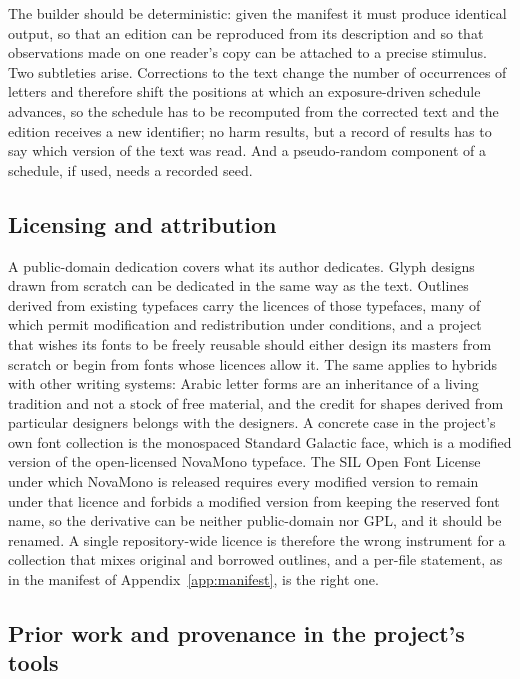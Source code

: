 The builder should be deterministic: given the manifest it must produce identical output, so that an edition can be reproduced from its description and so that observations made on one reader's copy can be attached to a precise stimulus. Two subtleties arise. Corrections to the text change the number of occurrences of letters and therefore shift the positions at which an exposure-driven schedule advances, so the schedule has to be recomputed from the corrected text and the edition receives a new identifier; no harm results, but a record of results has to say which version of the text was read. And a pseudo-random component of a schedule, if used, needs a recorded seed.

\subsection{Licensing and attribution}

A public-domain dedication covers what its author dedicates. Glyph designs drawn from scratch can be dedicated in the same way as the text. Outlines derived from existing typefaces carry the licences of those typefaces, many of which permit modification and redistribution under conditions, and a project that wishes its fonts to be freely reusable should either design its masters from scratch or begin from fonts whose licences allow it. The same applies to hybrids with other writing systems: Arabic letter forms are an inheritance of a living tradition and not a stock of free material, and the credit for shapes derived from particular designers belongs with the designers. A concrete case in the project's own font collection is the monospaced Standard Galactic face, which is a modified version of the open-licensed NovaMono typeface. The SIL Open Font License under which NovaMono is released requires every modified version to remain under that licence and forbids a modified version from keeping the reserved font name, so the derivative can be neither public-domain nor GPL, and it should be renamed. A single repository-wide licence is therefore the wrong instrument for a collection that mixes original and borrowed outlines, and a per-file statement, as in the manifest of Appendix~\ref{app:manifest}, is the right one.

\subsection{Prior work and provenance in the project's tools}\label{sec:prior}

